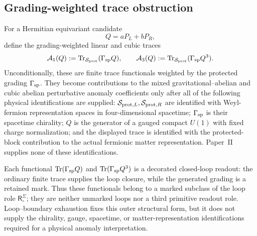 \documentclass[12pt,a4paper]{article}
\begin{document}
\subsection{Grading-weighted trace obstruction}
\label{p2:subsec:kin-anomalies}

For a Hermitian equivariant candidate
\[
        Q=aP_L+bP_R,
\]
define the grading-weighted linear and cubic traces
\[
        \mathcal A_1(Q):=\operatorname{Tr}_{\mathcal S_{\rm prot}}(\Gamma_{\rm sp}Q),
        \qquad
        \mathcal A_3(Q):=\operatorname{Tr}_{\mathcal S_{\rm prot}}(\Gamma_{\rm sp}Q^3).
\]
Unconditionally, these are finite trace functionals weighted by the protected
grading \(\Gamma_{\rm sp}\).  They become contributions to the mixed
gravitational--abelian and cubic abelian perturbative anomaly coefficients
only after all of the following physical identifications are supplied:
\(\mathcal S_{{\rm prot},L},\mathcal S_{{\rm prot},R}\) are identified with
Weyl-fermion representation spaces in four-dimensional spacetime; \(\Gamma_{\rm sp}\) is their spacetime chirality; \(Q\) is the
generator of a gauged compact \(U(1)\) with fixed charge normalization; and
the displayed trace is identified with the protected-block contribution to
the actual fermionic matter representation.  Paper~II supplies none of
these identifications.

\begin{remark}
\label{p2e:rem:anomaly-traces-decorated-loop}
Each functional \(\operatorname{Tr}(\Gamma_{\rm sp}Q)\) and
\(\operatorname{Tr}(\Gamma_{\rm sp}Q^3)\) is a decorated closed-loop readout: the ordinary
finite trace supplies the loop closure, while the generated grading is a
retained mark.  Thus these functionals belong to a marked subclass of the
loop role \(\mathsf R_{\circ}^{\Sigma}\); they are neither unmarked loops nor
a third primitive readout role.  Loop--boundary exhaustion fixes this outer
structural form, but it does not supply the chirality, gauge, spacetime, or
matter-representation identifications required for a physical anomaly
interpretation.
\end{remark}
\end{document}
